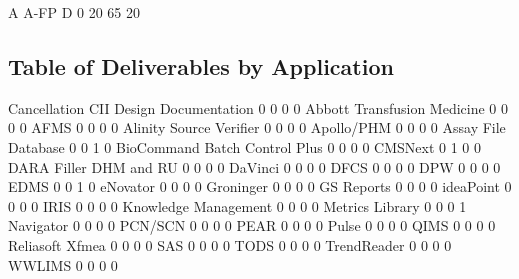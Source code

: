 \documentclass{article}
\begin{document}
\begin{Schunk}
\begin{Soutput}
        A A-FP    D 
   0   20   65   20 
\end{Soutput}
\end{Schunk}

\subsection{Table of Deliverables by Application}
\begin{Schunk}
\begin{Soutput}
                                  Cancellation CII Design Documentation
                                0            0   0                    0
  Abbott Transfusion Medicine   0            0   0                    0
  AFMS                          0            0   0                    0
  Alinity Source Verifier       0            0   0                    0
  Apollo/PHM                    0            0   0                    0
  Assay File Database           0            0   1                    0
  BioCommand Batch Control Plus 0            0   0                    0
  CMSNext                       0            1   0                    0
  DARA Filler DHM and RU        0            0   0                    0
  DaVinci                       0            0   0                    0
  DFCS                          0            0   0                    0
  DPW                           0            0   0                    0
  EDMS                          0            0   1                    0
  eNovator                      0            0   0                    0
  Groninger                     0            0   0                    0
  GS Reports                    0            0   0                    0
  ideaPoint                     0            0   0                    0
  IRIS                          0            0   0                    0
  Knowledge Management          0            0   0                    0
  Metrics Library               0            0   0                    1
  Navigator                     0            0   0                    0
  PCN/SCN                       0            0   0                    0
  PEAR                          0            0   0                    0
  Pulse                         0            0   0                    0
  QIMS                          0            0   0                    0
  Reliasoft Xfmea               0            0   0                    0
  SAS                           0            0   0                    0
  TODS                          0            0   0                    0
  TrendReader                   0            0   0                    0
  WWLIMS                        0            0   0                    0
                               

\end{Soutput}
\end{Schunk}
\end{document}
